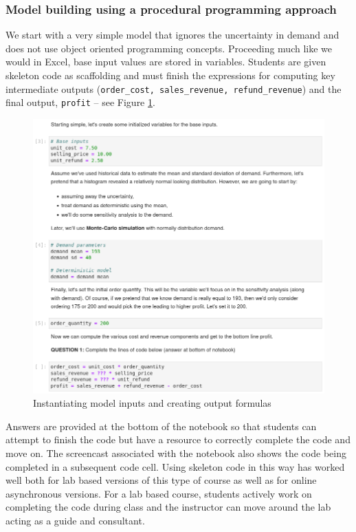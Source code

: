 \documentclass[ited]{informs3}                      %
\newcommand{\code}[1]{\texttt{#1}}
\begin{document}
\subsubsection{Model building using a procedural programming approach}
 
We start with a very simple model that ignores the uncertainty in demand and does not use object oriented programming concepts. Proceeding much like we would in Excel, base input values are stored in variables. Students are given skeleton code as scaffolding and must finish the expressions for computing key intermediate outputs (\code{order\_cost, sales\_revenue, refund\_revenue}) and the final output, \code{profit} -- see Figure \ref{fig:model_inputs}.


\begin{figure}[!htbp]
\centering
\includegraphics[scale=0.5]{images/model_inputs}
\caption{Instantiating model inputs and creating output formulas}
\label{fig:model_inputs}
\end{figure}

Answers are provided at the bottom of the notebook so that students can attempt to finish the code but have a resource to correctly complete the code and move on. The screencast associated with the notebook also shows the code being completed in a subsequent code cell. Using skeleton code in this way has worked well both for lab based versions of this type of course as well as for online asynchronous versions. For a lab based course, students actively work on completing the code during class and the instructor can move around the lab acting as a guide and consultant.
\end{document}
